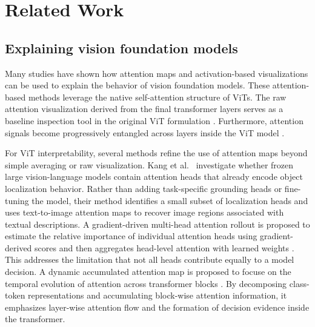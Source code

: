 \documentclass[lineno,pdflatex,sn-mathphys-num]{sn-jnl}%
\theoremstyle{thmstyleone}%
\theoremstyle{thmstyletwo}%
\theoremstyle{thmstylethree}%
\begin{document}
\section{Related Work} \label{section related works}

\subsection{Explaining vision foundation models}

Many studies have shown how attention maps and activation-based visualizations can be used to explain the behavior of vision foundation models. These attention-based methods leverage the native self-attention structure of ViTs. The raw attention visualization derived from the final transformer layers serves as a baseline inspection tool in the original ViT formulation \cite{dosovitskiy21vit}. Furthermore, attention signals become progressively entangled across layers inside the ViT model \cite{Abnar20Rollout}.

For ViT interpretability, several methods refine the use of attention maps beyond simple averaging or raw visualization. Kang et al.~\cite{Kang20259339} investigate whether frozen large vision-language models contain attention heads that already encode object localization behavior. Rather than adding task-specific grounding heads or fine-tuning the model, their method identifies a small subset of localization heads and uses text-to-image attention maps to recover image regions associated with textual descriptions.  A gradient-driven multi-head attention rollout is proposed to estimate the relative importance of individual attention heads using gradient-derived scores and then aggregates head-level attention with learned weights \cite{Jo2025582}. This addresses the limitation that not all heads contribute equally to a model decision. A dynamic accumulated attention map is proposed to focuse on the temporal evolution of attention across transformer blocks \cite{Liao2025PR}. By decomposing class-token representations and accumulating block-wise attention information, it emphasizes layer-wise attention flow and the formation of decision evidence inside the transformer.
\end{document}
